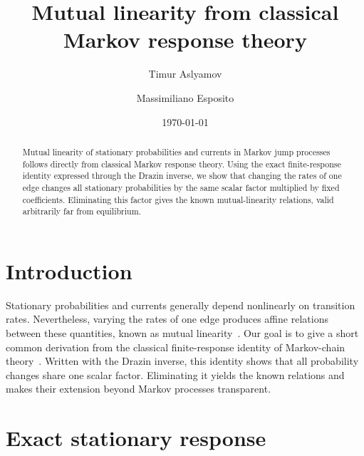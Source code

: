 \documentclass[
  reprint,
  superscriptaddress,
  amsmath,
  amssymb,
  aps,
  pre,
  longbibliography
]{revtex4-2}
\begin{document}
\title{Mutual linearity from classical Markov response theory}

\author{Timur Aslyamov}

\author{Massimiliano Esposito}

\date{\today}


\begin{abstract}
Mutual linearity of stationary probabilities and currents in Markov jump
processes follows directly from classical Markov response theory.
Using the exact finite-response identity expressed through the Drazin
inverse, we show that changing the rates of one edge changes all
stationary probabilities by the same scalar factor multiplied by fixed
coefficients. Eliminating this factor gives the known mutual-linearity
relations, valid arbitrarily far from equilibrium.
\end{abstract}
\maketitle

\section{Introduction}
\label{sec:introduction}

Stationary probabilities and currents generally depend nonlinearly on
transition rates. Nevertheless, varying the rates of one edge produces
affine relations between these quantities, known as mutual
linearity~\cite{Harunari2024,Khodabandehlou2025,BebonSpeck2026}.
Our goal is to give a short common derivation from the classical
finite-response identity of Markov-chain theory~\cite{Schweitzer1968,Meyer1980}.
Written with the Drazin inverse, this identity shows that all probability
changes share one scalar factor. Eliminating it yields the known
relations and makes their extension beyond Markov processes transparent.

\section{Exact stationary response}
\label{sec:response}
\end{document}

